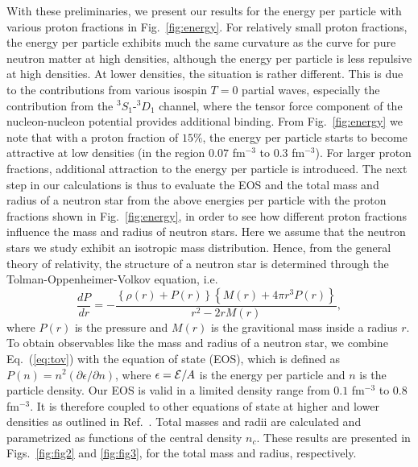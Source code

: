 With these preliminaries, we present our results for the
energy per particle with various proton fractions
in Fig.\ \ref{fig:energy}.
For relatively small proton fractions,
the energy per
particle exhibits much the same curvature as the curve for pure neutron 
matter at high densities, although the energy per particle is less repulsive
at high densities.
At lower densities, the situation is rather
different.
This is due to the contributions from various isospin $T=0$ partial waves,
especially the contribution from the $^3S_1$-$^3D_1$ channel, where the
tensor force component of the nucleon-nucleon potential provides
additional binding. 
From Fig.\ \ref{fig:energy} we note that
with a proton fraction of $15\%$, the energy per particle
starts to become attractive at low densities (in the region $0.07$ fm$^{-3}$
to $0.3$ fm$^{-3}$). For larger proton fractions, additional 
attraction to the energy 
per particle is introduced.
The next step in our calculations is thus to evaluate the EOS and the total mass
and radius of a neutron star from the above energies per particle with
the proton fractions shown in Fig.\ \ref{fig:energy}, in order
to see how different proton fractions influence the mass and radius of 
neutron stars.
Here we
assume that the neutron stars we study exhibit an isotropic
mass distribution. Hence, from the general theory of relativity,
the structure of a neutron star is determined through the
Tolman-Oppenheimer-Volkov equation, i.e.\
\begin{equation}
   \frac{dP}{dr}=
    - \frac{\left\{\rho (r)+P(r) \right\}
    \left\{M(r)+4\pi r^3 P(r)\right\}}{r^2- 2rM(r)},
   \label{eq:tov}
\end{equation}
where $P(r)$ is the pressure and $M(r)$ is
the gravitional mass inside a radius $r$.
To obtain 
observables like the mass and radius of a neutron star, we combine 
Eq.\ (\ref{eq:tov}) with the equation of state (EOS), which is defined as
$P(n)=n^2 \left(\partial \epsilon/\partial n\right)$,
where $\epsilon ={\cal E}/A$ is
the energy per particle and $n$ is the particle
density.
Our EOS is valid in a limited density range from $0.1$ fm$^{-3}$
to $0.8$ fm$^{-3}$. It is therefore coupled to other equations
of state at higher and lower densities as outlined in Ref.\ 
\cite{behoo94}. Total masses and radii are calculated and parametrized
as functions of the central density $n_c$. These results are presented in
Figs.\ \ref{fig:fig2} and \ref{fig:fig3}, for the total mass and
radius, respectively.

